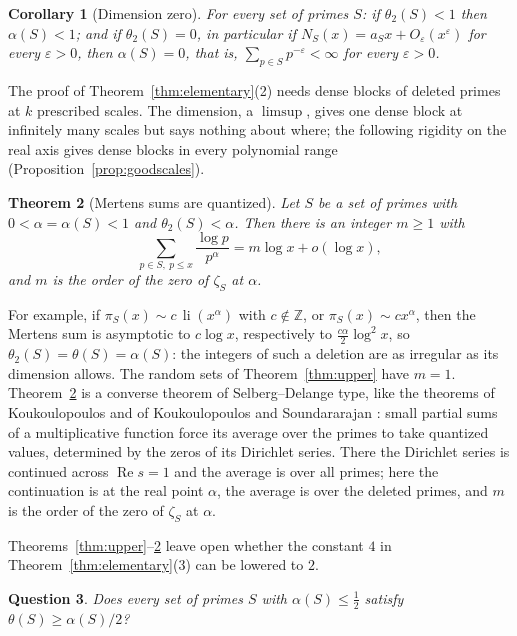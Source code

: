 \documentclass[11pt]{amsart}
\newtheorem{theorem}{Theorem}
\newtheorem{corollary}[theorem]{Corollary}
\newtheorem{question}[theorem]{Question}
\theoremstyle{remark}
\numberwithin{equation}{section}
\newcommand{\Z}{\mathbb{Z}}
\newcommand{\eps}{\varepsilon}
\DeclareMathOperator{\re}{Re}
\DeclareMathOperator{\li}{li}
\begin{document}
\begin{corollary}[Dimension zero]\label{cor:dimzero}
For every set of primes $S$: if $\theta_2(S)<1$ then $\alpha(S)<1$; and if $\theta_2(S)=0$, in particular if $N_S(x)=a_Sx+O_\eps(x^{\eps})$ for every $\eps>0$, then $\alpha(S)=0$, that is, $\sum_{p\in S}p^{-\eps}<\infty$ for every $\eps>0$.
\end{corollary}

The proof of Theorem~\ref{thm:elementary}(2) needs dense blocks of deleted primes at $k$ prescribed scales. The dimension, a $\limsup$, gives one dense block at infinitely many scales but says nothing about where; the following rigidity on the real axis gives dense blocks in every polynomial range (Proposition~\ref{prop:goodscales}).

\begin{theorem}[Mertens sums are quantized]\label{thm:quant}
Let $S$ be a set of primes with $0<\alpha=\alpha(S)<1$ and $\theta_2(S)<\alpha$. Then there is an integer $m\ge1$ with
\[
\sum_{p\in S,\ p\le x}\frac{\log p}{p^{\alpha}}=m\log x+o(\log x),
\]
and $m$ is the order of the zero of $\zeta_S$ at $\alpha$.
\end{theorem}

For example, if $\pi_S(x)\sim c\,\li(x^{\alpha})$ with $c\notin\Z$, or $\pi_S(x)\sim cx^{\alpha}$, then the Mertens sum is asymptotic to $c\log x$, respectively to $\tfrac{c\alpha}{2}\log^2x$, so $\theta_2(S)=\theta(S)=\alpha(S)$: the integers of such a deletion are as irregular as its dimension allows. The random sets of Theorem~\ref{thm:upper} have $m=1$. Theorem~\ref{thm:quant} is a converse theorem of Selberg--Delange type, like the theorems of Koukoulopoulos \cite{K13} and of Koukoulopoulos and Soundararajan \cite{KS20}: small partial sums of a multiplicative function force its average over the primes to take quantized values, determined by the zeros of its Dirichlet series. There the Dirichlet series is continued across $\re s=1$ and the average is over all primes; here the continuation is at the real point $\alpha$, the average is over the deleted primes, and $m$ is the order of the zero of $\zeta_S$ at $\alpha$.

Theorems~\ref{thm:upper}--\ref{thm:quant} leave open whether the constant $4$ in Theorem~\ref{thm:elementary}(3) can be lowered to $2$.

\begin{question}\label{q:rigid}
Does every set of primes $S$ with $\alpha(S)\le\tfrac12$ satisfy $\theta(S)\ge\alpha(S)/2$?
\end{question}
\end{document}
